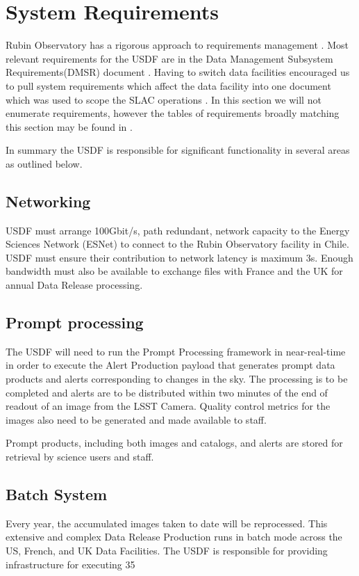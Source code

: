 \section{System Requirements} \label{sec:requirements}

Rubin Observatory has a rigorous approach to requirements management \cite{2016SPIE.9911E..0DS}.
Most relevant requirements for the USDF are in the Data Management Subsystem Requirements(DMSR) document \cite{LSE-61}.
Having to switch data facilities encouraged us to pull system requirements which affect the data facility into one document
which was used to scope the SLAC operations \cite{rtn-080}.
In this section we will not enumerate requirements, however the tables of requirements broadly matching this section may be found in \cite{rtn-080}.

In summary the USDF is responsible for significant functionality in several areas as outlined below.


\subsection{Networking } \label{sec:networking}

USDF must arrange 100Gbit/s, path redundant, network capacity to the Energy Sciences Network (ESNet) to connect to the Rubin Observatory facility in Chile.
USDF must ensure their contribution to network latency is maximum 3s.
Enough bandwidth must also be available to exchange files with France and the UK for annual Data Release processing.

\subsection{Prompt processing} \label{sec:prompproc}
The USDF will need to run the Prompt Processing framework in near-real-time in order to execute the Alert Production payload that generates prompt data products and alerts corresponding to changes in the sky.
The processing is to be completed and alerts are to be distributed within two minutes of the end of readout of an image from the LSST Camera.
Quality control metrics for the images also need to be generated and made available to staff.

Prompt products, including both images and catalogs, and alerts are stored for retrieval by science users and staff.

\subsection{Batch System} \label{sec:offlineprod}
Every year, the accumulated images taken to date will be reprocessed.
This extensive and complex Data Release Production runs in batch mode across the US, French, and UK Data Facilities.
The USDF is responsible for providing infrastructure for executing 35%

